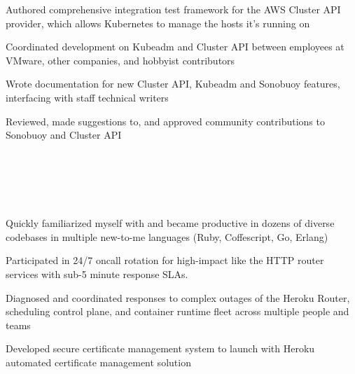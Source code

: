 \documentclass[letterpaper,11pt,notitlepage]{article}
\begin{document}
        \begin{employment}
          \item Authored comprehensive integration test framework for the
            AWS Cluster API provider, which allows Kubernetes to manage the hosts it's running on
          \item Coordinated development on Kubeadm and Cluster API between
            employees at VMware, other companies, and hobbyist contributors
          \item Wrote documentation for new Cluster API, Kubeadm and Sonobuoy
            features, interfacing with staff technical writers
          \item Reviewed, made suggestions to, and approved community contributions to Sonobuoy and Cluster API
        \end{employment}
         \\
         \\
         \\
         \\
        \begin{employment}
            \item Quickly familiarized myself with and became productive in
              dozens of diverse codebases in multiple new-to-me languages (Ruby,
              Coffescript, Go, Erlang)
            \item Participated in 24/7 oncall rotation for high-impact like the HTTP router
              services with sub-5 minute response SLAs.
            \item Diagnosed and coordinated responses to complex outages of the
              Heroku Router, scheduling control plane, and container runtime
              fleet across multiple people and teams
            \item Developed secure certificate management system to launch with
              Heroku automated certificate management solution
        \end{employment}
\end{document}
